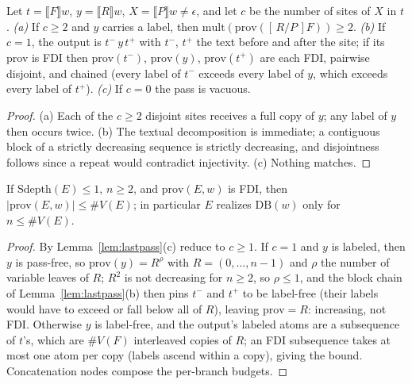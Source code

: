 \begin{lemma}
    \label{lem:lastpass}
    Let $t = \llbracket F \rrbracket w$, $y = \llbracket R
    \rrbracket w$, $X = \llbracket P \rrbracket w \neq \epsilon$,
    and let $c$ be the number of sites of $X$ in $t$.
    \emph{(a)} If $c \geq 2$ and $y$ carries a label, then
    $\mathrm{mult}(\mathrm{prov}([\,R/P\,]F)) \geq 2$.
    \emph{(b)} If $c = 1$, the output is $t^- \, y \, t^+$ with
    $t^-$, $t^+$ the text before and after the site; if its prov is
    FDI then $\mathrm{prov}(t^-)$, $\mathrm{prov}(y)$,
    $\mathrm{prov}(t^+)$ are each FDI, pairwise disjoint, and
    chained (every label of $t^-$ exceeds every label of $y$, which
    exceeds every label of $t^+$).
    \emph{(c)} If $c = 0$ the pass is vacuous.
\end{lemma}

\begin{proof}
    (a) Each of the $c \geq 2$ disjoint sites receives a full copy
    of $y$; any label of $y$ then occurs twice.
    (b) The textual decomposition is immediate; a contiguous block of
    a strictly decreasing sequence is strictly decreasing, and
    disjointness follows since a repeat would contradict
    injectivity.
    (c) Nothing matches.
\end{proof}

\begin{theorem}
    \label{thm:depth1}
    If $\mathrm{Sdepth}(E) \leq 1$, $n \geq 2$, and
    $\mathrm{prov}(E,w)$ is FDI, then $|\mathrm{prov}(E,w)| \leq
    \#V(E)$; in particular $E$ realizes $\mathrm{DB}(w)$ only for
    $n \leq \#V(E)$.
\end{theorem}

\begin{proof}
    By Lemma~\ref{lem:lastpass}(c) reduce to $c \geq 1$.  If $c = 1$
    and $y$ is labeled, then $y$ is pass-free, so $\mathrm{prov}(y) =
    R^{\rho}$ with $R = (0,\ldots,n-1)$ and $\rho$ the number of
    variable leaves of $R$; $R^{2}$ is not decreasing for $n \geq 2$,
    so $\rho \leq 1$, and the block chain of
    Lemma~\ref{lem:lastpass}(b) then pins $t^-$ and $t^+$ to be
    label-free (their labels would have to exceed or fall below all
    of $R$), leaving $\mathrm{prov} = R$: increasing, not FDI.
    Otherwise $y$ is label-free, and the output's labeled atoms are a
    subsequence of $t$'s, which are $\#V(F)$ interleaved copies of
    $R$; an FDI subsequence takes at most one atom per copy (labels
    ascend within a copy), giving the bound.  Concatenation nodes
    compose the per-branch budgets.
\end{proof}

